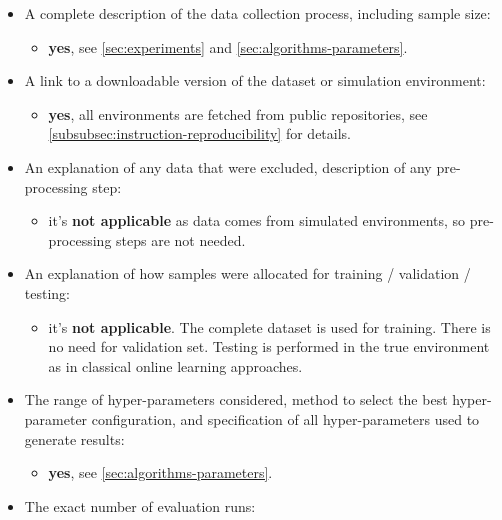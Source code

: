 \begin{itemize}
    \item A complete description of the data collection process, including sample size: 
    
        \begin{itemize}
            \item\textbf{yes}, see \autoref{sec:experiments} and \autoref{sec:algorithms-parameters}.
        \end{itemize}
    \item A link to a downloadable version of the dataset or simulation environment:
    
        \begin{itemize}
            \item  \textbf{yes}, all environments  are fetched from public repositories, see \autoref{subsubsec:instruction-reproducibility} for details.
        \end{itemize}
    \item An explanation of any data that were excluded, description of any pre-processing step: 
        \begin{itemize}
            \item it's \textbf{not applicable} as data comes from simulated environments, so pre-processing steps are not needed.
        \end{itemize}

    \item An explanation of how samples were allocated for training / validation / testing: 
        \begin{itemize}
            \item it's \textbf{not applicable}. The complete dataset is used for training. There is no need for validation set. Testing is performed in the true environment as in classical online learning approaches.
        \end{itemize}

    \item The range of hyper-parameters considered, method to select the best hyper-parameter configuration, and specification of all hyper-parameters used to generate results: 
    
        \begin{itemize}
            \item \textbf{yes}, see \autoref{sec:algorithms-parameters}.
        \end{itemize}

    \item The exact number of evaluation runs: 
    

\end{itemize}
